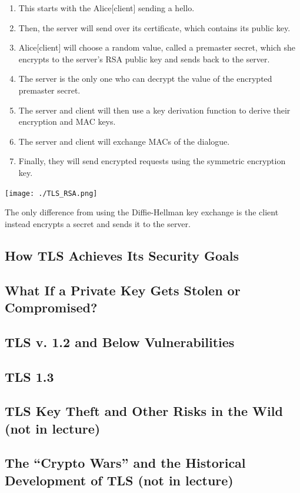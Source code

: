 \documentclass[11pt]{article} %
\begin{document}
\begin{enumerate}
  \item This starts with the Alice[client] sending a hello.
  \item Then, the server will send over its certificate, which contains its 
  public key.
  \item Alice[client] will choose a random value, called a premaster secret, 
  which she encrypts to the server's RSA public key and sends back to the 
  server.
  \item The server is the only one who can decrypt the value of the encrypted 
  premaster secret.
  \item The server and client will then use a key derivation function to 
  derive their encryption and MAC keys.
  \item The server and client will exchange MACs of the dialogue.
  \item Finally, they will send encrypted requests using the symmetric 
  encryption key.
\end{enumerate}

\texttt{[image: ./TLS\_RSA.png]}

The only difference from using the Diffie-Hellman key exchange is the client 
instead encrypts a secret and sends it to the server.

\newpage
\subsection{How TLS Achieves Its Security Goals}

\subsection{What If a Private Key Gets Stolen or Compromised?}

\subsection{TLS v. 1.2 and Below Vulnerabilities}

\subsection{TLS 1.3}

\subsection{TLS Key Theft and Other Risks in the Wild (not in lecture)}

\subsection{The “Crypto Wars” and the Historical Development of TLS (not in 
lecture)}
\end{document}
